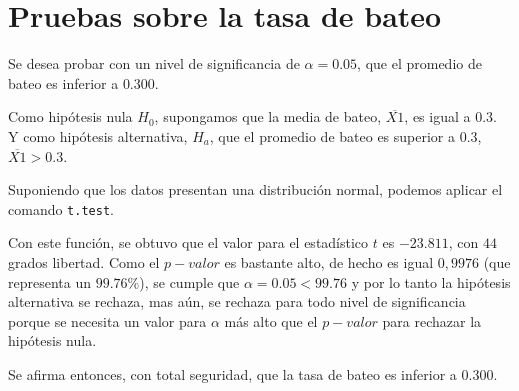 \documentclass{staprojteamusb}
\begin{document}
	
	
	\maketitle
	
	
	
	\hypertarget{pruebas-sobre-la-tasa-de-bateo}{%
 \section{Pruebas sobre la tasa de
 bateo}\label{pruebas-sobre-la-tasa-de-bateo}}

 Se desea probar con un nivel de significancia de \(\alpha=0.05\), que
 el promedio de bateo es inferior a \(0.300\).

 Como hipótesis nula \(H_{0}\), supongamos que la media de bateo,
 \(\overline{X1}\), es igual a \(0.3\). Y como hipótesis alternativa,
 \(H_{a}\), que el promedio de bateo es superior a \(0.3\),
 \(\overline{X1}>0.3\).

 Suponiendo que los datos presentan una distribución normal, podemos
 aplicar el comando \texttt{t.test}.

 Con este función, se obtuvo que el valor para el estadístico \(t\) es
 \(-23.811\), con \(44\) grados libertad. Como el \(p-valor\) es
 bastante alto, de hecho es igual \(0,9976\) (que representa un
 \(99.76\%\)), se cumple que \(\alpha=0.05<99.76\) y por lo tanto la
 hipótesis alternativa se rechaza, mas aún, se rechaza para todo nivel
 de significancia porque se necesita un valor para \(\alpha\) más alto
 que el \(p-valor\) para rechazar la hipótesis nula.

 Se afirma entonces, con total seguridad, que la tasa de bateo es
 inferior a \(0.300\).
	
	
	
	\printbibliography
	
	
	
	
\end{document}
